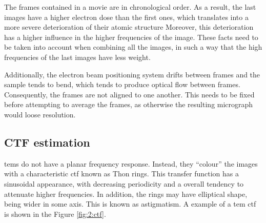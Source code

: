 \documentclass[../main.tex]{subfiles}
\begin{document}
The frames contained in a movie are in chronological order. As a result, the last images have a higher electron dose than the first ones, which translates into a more severe deterioration of their atomic structure  Moreover, this deterioration has a higher influence in the higher frequencies of the image. These facts need to be taken into account when combining all the images, in such a way that the high frequencies of the last images have less weight\cite{cryoem101}. 

Additionally, the electron beam positioning system drifts between frames and the sample tends to bend, which tends to produce optical flow between frames. Consequently, the frames are not aligned to one another. This needs to be fixed before attempting to average the frames, as otherwise the resulting micrograph would loose resolution.

\subsection{CTF estimation}
\Glspl{tem} do not have a planar frequency response. Instead, they ``colour'' the images with a characteristic \gls{ctf} known as Thon rings. This transfer function has a sinusoidal appearance, with decreasing periodicity and a overall tendency to attenuate higher frequencies\cite{cryoem101}.  In addition, the rings may have elliptical shape, being wider in some axis. This is known as astigmatism. A example of a \gls{tem} \gls{ctf} is shown in the Figure \ref{fig:2:ctf}.
\end{document}

